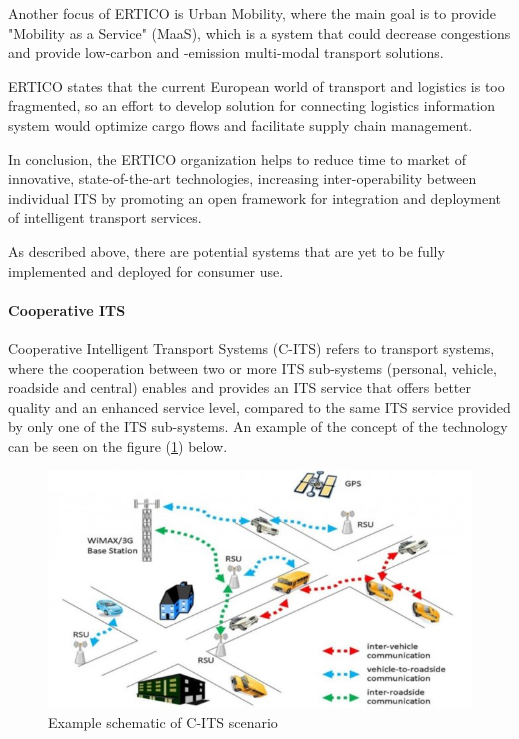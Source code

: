 \documentclass[main.tex]{subfiles}
\begin{document}
Another focus of ERTICO is Urban Mobility, where the main goal is to provide "Mobility as a Service" (MaaS), 
which is a system that could decrease congestions and provide low-carbon and -emission multi-modal transport 
solutions.  

ERTICO states that the current European world of transport and logistics is too fragmented, so an effort to 
develop solution for connecting logistics information system would optimize cargo flows and facilitate supply 
chain management. 

In conclusion, the ERTICO organization helps to reduce time to market of innovative,
state-of-the-art technologies, increasing inter-operability between individual ITS by promoting
an open framework for integration and deployment of intelligent transport services. 

As described above, there are potential systems that are yet to be fully implemented and
deployed for consumer use. 

\paragraph{Cooperative ITS}

Cooperative Intelligent Transport Systems (C-ITS) refers to transport systems, where the
cooperation between two or more ITS sub-systems (personal, vehicle, roadside and central)
enables and provides an ITS service that offers better quality and an enhanced service level,
compared to the same ITS service provided by only one of the ITS sub-systems.\cite{2022} 
An example of the concept of the technology can be seen on the figure (\ref{c-its}) below. 

\begin{figure}[htbp]
    \centering
    \includegraphics[width=.8\textwidth]{c-its.jpg}
    \caption{Example schematic of C-ITS scenario}
    \label{c-its}
\end{figure}
\end{document}

